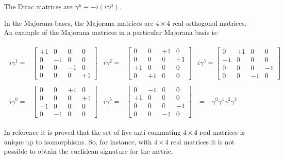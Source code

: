 \documentclass[11pt]{book}
\begin{document}
The Dirac matrices are \(\gamma^\mu\equiv
-i(i\gamma^\mu)\).

In the Majorana bases, the Majorana matrices are \(4\times 4\) real
orthogonal matrices. An example of the Majorana matrices in a particular
Majorana basis is:

\begin{equation}\begin{aligned}
\begin{array}{llllll}
\label{basis}
i\gamma^1=&\left[ \begin{smallmatrix}
+1 & 0 & 0 & 0 \\
0 & -1 & 0 & 0 \\
0 & 0 & -1 & 0 \\
0 & 0 & 0 & +1 \end{smallmatrix} \right]&
i\gamma^2=&\left[ \begin{smallmatrix}
0 & 0 & +1 & 0 \\
0 & 0 & 0 & +1 \\
+1 & 0 & 0 & 0 \\
0 & +1 & 0 & 0 \end{smallmatrix} \right]&
i\gamma^3=\left[ \begin{smallmatrix}
0 & +1 & 0 & 0 \\
+1 & 0 & 0 & 0 \\
0 & 0 & 0 & -1 \\
0 & 0 & -1 & 0 \end{smallmatrix} \right]\\
\\
i\gamma^0=&\left[ \begin{smallmatrix}
0 & 0 & +1 & 0 \\
0 & 0 & 0 & +1 \\
-1 & 0 & 0 & 0 \\
0 & -1 & 0 & 0 \end{smallmatrix} \right]&
i\gamma^5=&\left[ \begin{smallmatrix}
0 & -1 & 0 & 0 \\
+1 & 0 & 0 & 0 \\
0 & 0 & 0 & +1 \\
0 & 0 & -1 & 0 \end{smallmatrix} \right]&
=-\gamma^0\gamma^1\gamma^2\gamma^3
\end{array}\end{aligned}\end{equation}

In reference
\cite{Oux2019Raifeartaigh1961dirac} it is proved that the set of five anti-commuting \(4\times 4\)
real matrices is unique up to isomorphisms. So, for instance, with
\(4\times 4\) real matrices it is not possible to obtain the euclidean
signature for the metric.
\end{document}
